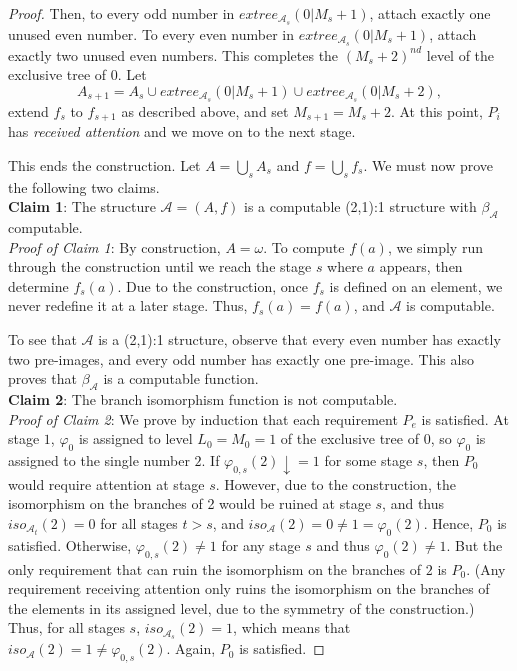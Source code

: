 \documentclass[12pt]{article}
\begin{document}
\begin{proof}
Then, to every odd number in $extree_{\mathcal{A}_s}(0|M_s+1)$, attach exactly one unused even number. To every even number in $extree_{\mathcal{A}_s}(0|M_s+1)$, attach exactly two unused even numbers. This completes the $(M_s+2)^{nd}$ level of the exclusive tree of $0$. Let\\
$$A_{s+1}=A_s \cup extree_{\mathcal{A}_s}(0|M_s+1) \cup extree_{\mathcal{A}_s}(0|M_s+2),$$ 
extend $f_s$ to $f_{s+1}$ as described above, and set $M_{s+1}=M_s+2$. At this point, $P_i$ has \emph{received attention} and we move on to the next stage.

This ends the construction. Let $A = \bigcup_s A_s$ and $f=\bigcup_s f_s$. We must now prove the following two claims.\\

\textbf{Claim 1}: The structure $\mathcal{A}=(A,f)$ is a computable (2,1):1 structure with $\beta_\mathcal{A}$ computable.\\

\emph{Proof of Claim 1}: By construction, $A=\omega$. To compute $f(a)$, we simply run through the construction until we reach the stage $s$ where $a$ appears, then determine $f_s(a)$. Due to the construction, once $f_s$ is defined on an element, we never redefine it at a later stage. Thus, $f_s(a)=f(a)$, and $\mathcal{A}$ is computable. 

To see that $\mathcal{A}$ is a (2,1):1 structure, observe that every even number has exactly two pre-images, and every odd number has exactly one pre-image. This also proves that $\beta_\mathcal{A}$ is a computable function.\\

\textbf{Claim 2}: The branch isomorphism function is not computable.\\

\emph{Proof of Claim 2}: We prove by induction that each requirement $P_e$ is satisfied. At stage $1$, $\varphi_0$ is assigned to level $L_0=M_0=1$ of the exclusive tree of $0$, so $\varphi_0$ is assigned to the single number $2$. If $\varphi_{0,s}(2)\downarrow=1$ for some stage $s$, then $P_0$ would require attention at stage $s$. However, due to the construction, the isomorphism on the branches of 2 would be ruined at stage $s$, and thus $iso_{\mathcal{A}_t}(2)=0$ for all stages $t>s$, and $iso_\mathcal{A}(2)=0 \not=1=\varphi_0(2)$. Hence, $P_0$ is satisfied. Otherwise, $\varphi_{0,s}(2)\not=1$ for any stage $s$ and thus $\varphi_0(2)\not=1$. But the only requirement that can ruin the isomorphism on the branches of $2$ is $P_0$. (Any requirement receiving attention only ruins the isomorphism on the branches of the elements in its assigned level, due to the symmetry of the construction.) Thus, for all stages $s$, $iso_{\mathcal{A}_s}(2)=1$, which means that $iso_{\mathcal{A}}(2)=1\not=\varphi_{0,s}(2)$. Again, $P_0$ is satisfied.


\end{proof}
\end{document}
